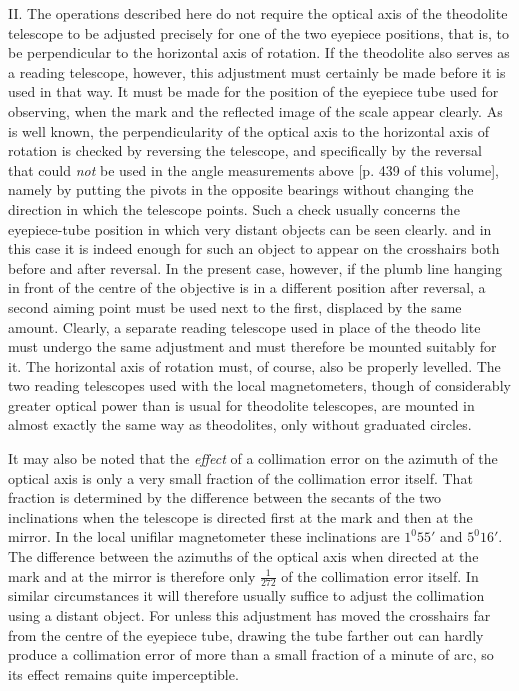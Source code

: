 II. The operations described here do not require the optical axis of the theodolite telescope to be adjusted precisely for one of the two eyepiece positions, that is, to be perpendicular to the horizontal axis of rotation. If the theodolite also serves as a reading telescope, however, this adjustment must certainly be made before it is used in that way. It must be made for the position of the eyepiece tube used for observing, when the mark and the reflected image of the scale appear clearly. As is well known, the perpendicularity of the optical axis to the horizontal axis of rotation is checked by reversing the telescope, and specifically by the reversal that could \textit{not} be used in the angle measurements above [p. 439 of this volume], namely by putting the pivots in the opposite bearings without changing the direction in which the telescope points. Such a check usually concerns the eyepiece-tube position in which very distant objects can be seen clearly. and in this case it is indeed enough for such an object to appear on the crosshairs both before and after reversal. In the present case, however, if the plumb line hanging in front of the centre of the objective is in a different position after reversal, a second aiming point must be used next to the first, displaced by the same amount. Clearly, a separate reading telescope used in place of the theodo%
%
lite must undergo the same adjustment and must therefore be mounted suitably for it. The horizontal axis of rotation must, of course, also be properly levelled. The two reading telescopes used with the local magnetometers, though of considerably greater optical power than is usual for theodolite telescopes, are mounted in almost exactly the same way as theodolites, only without graduated circles.

It may also be noted that the \textit{effect} of a collimation error on the azimuth of the optical axis is only a very small fraction of the collimation error itself. That fraction is determined by the difference between the secants of the two inclinations when the telescope is directed first at the mark and then at the mirror. In the local unifilar magnetometer these inclinations are $1^0 55'$ and $5^0 16'$. The difference between the azimuths of the optical axis when directed at the mark and at the mirror is therefore only $\frac{1}{272}$ of the collimation error itself. In similar circumstances it will therefore usually suffice to adjust the collimation using a distant object. For unless this adjustment has moved the crosshairs far from the centre of the eyepiece tube, drawing the tube farther out can hardly produce a collimation error of more than a small fraction of a minute of arc, so its effect remains quite imperceptible.

